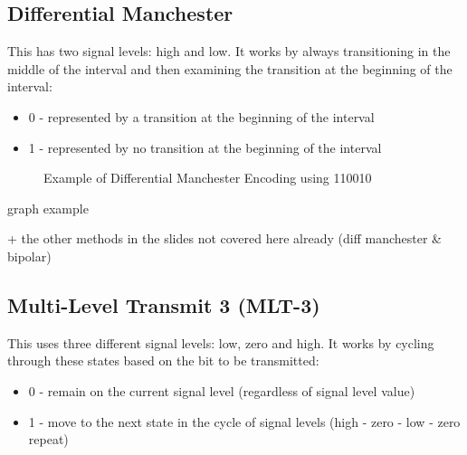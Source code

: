 \subsection{Differential Manchester}
This has two signal levels: high and low. It works by always transitioning in the middle of the interval and then examining the transition at the beginning of the interval:
\begin{itemize}
    \item 0 - represented by a transition at the beginning of the interval
    \item 1 - represented by no transition at the beginning of the interval
\end{itemize}

\begin{figure}[H]
\centering
{}
\caption{Example of Differential Manchester Encoding using 110010}
\end{figure}

\begin{todo}
    graph example

    + the other methods in the slides not covered here already (diff manchester \& bipolar)
\end{todo}

\subsection{Multi-Level Transmit 3 (MLT-3)}
This uses three different signal levels: low, zero and high. It works by cycling through these states based on the bit to be transmitted:
\begin{itemize}
    \item 0 - remain on the current signal level (regardless of signal level value)
    \item 1 - move to the next state in the cycle of signal levels (high - zero - low - zero repeat)
\end{itemize}

